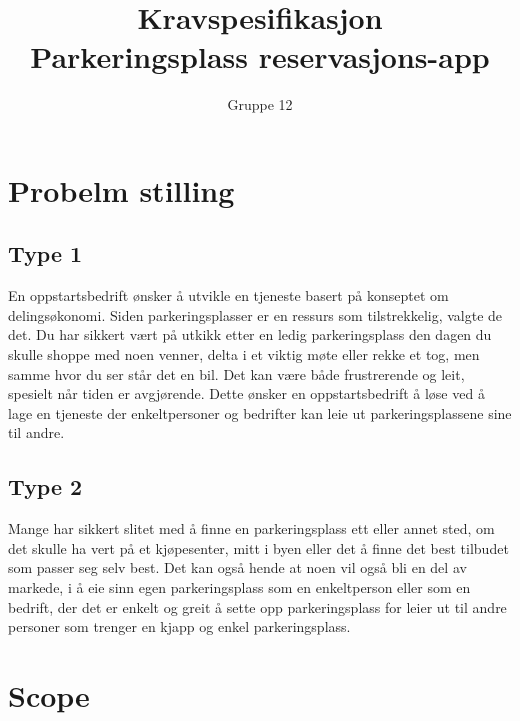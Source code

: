 \documentclass[12pt]{article}
\begin{document}
\title{%
    Kravspesifikasjon\\
    \large Parkeringsplass reservasjons-app }
\author{Gruppe 12}
\date{}
\maketitle

\newpage

\tableofcontents

\newpage

\section{Probelm stilling}

    \subsection{Type 1}
    En oppstartsbedrift ønsker å utvikle en tjeneste basert på konseptet om delingsøkonomi. Siden parkeringsplasser er en ressurs som tilstrekkelig, valgte de det. Du har sikkert vært på utkikk etter en ledig parkeringsplass den dagen du skulle shoppe med noen venner, delta i et viktig møte eller rekke et tog, men samme hvor du ser står det en bil. Det kan være både frustrerende og leit, spesielt når tiden er avgjørende. Dette ønsker en oppstartsbedrift å løse ved å lage en tjeneste der enkeltpersoner og bedrifter kan leie ut parkeringsplassene sine til andre.

    \subsection{Type 2}
    Mange har sikkert slitet med å finne en parkeringsplass ett eller annet sted, om det skulle ha vert på et kjøpesenter, mitt i byen eller det å finne det best tilbudet som passer seg selv best. Det kan også hende at noen vil også bli en del av markede, i å eie sinn egen parkeringsplass som en enkeltperson eller som en bedrift, der det er enkelt og greit å sette opp parkeringsplass for leier ut til andre personer som trenger en kjapp og enkel parkeringsplass. 

\section{Scope}
\end{document}
